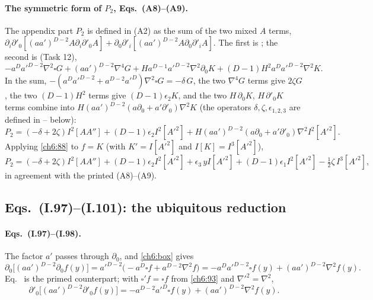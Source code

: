 \paragraph{The symmetric form of $P_2$, Eqs.~(A8)--(A9).} The appendix part $P_2$ is defined in (A2) as the sum of the two mixed $A$ terms,
$\partial_i\partial'_0[(aa')^{D-2}A\partial_i\partial'_0A]+\partial_0\partial'_i[(aa')^{D-2}A\partial_0\partial'_iA]$. The first is ; the second
is  (Task 12),
\begin{equation}
-a^Da'^{D-2}\nabla^2\square G+(aa')^{D-2}\nabla^4G+Ha^{D-1}a'^{D-2}\nabla^2\partial_0K+(D-1)H^2a^Da'^{D-2}\nabla^2K .
\end{equation}
In the sum, $-(a^Da'^{D-2}+a^{D-2}a'^D)\nabla^2\square G=-\delta\,G$, the two $\nabla^4G$ terms give $2\zeta G$, the two $(D-1)H^2$ terms give
$(D-1)\epsilon_2K$, and the two $H\,\partial_0K$, $H\,\partial'_0K$ terms combine into $H(aa')^{D-2}(a\partial_0+a'\partial'_0)\nabla^2K$
(the operators $\delta,\zeta,\epsilon_{1,2,3}$ are defined in -- below):
\begin{equation}
P_2=(-\delta+2\zeta)I^2[AA'']+(D-1)\epsilon_2I^2[A'^2]+H(aa')^{D-2}(a\partial_0+a'\partial'_0)\nabla^2I^2[A'^2] .\tag{I.A8}
\end{equation}
Applying \eqref{ch6:88} to $f=K$ (with $K'=I[A'^2]$ and $I[K]=I^3[A'^2]$),
\begin{equation}
P_2=(-\delta+2\zeta)I^2[AA'']+(D-1)\epsilon_2I^2[A'^2]+\epsilon_3\,yI[A'^2]+(D-1)\epsilon_1I^2[A'^2]-\tfrac12\zeta\,I^3[A'^2],\tag{I.A9}
\end{equation}
in agreement with the printed (A8)--(A9).

\subsection{Eqs.~(I.97)--(I.101): the ubiquitous reduction \texorpdfstring{\tD}{}}
\label{ch6:97-101}

\paragraph{Eqs.~(I.97)--(I.98).} The factor $a'$ passes through $\partial_0$, and \eqref{ch6:box} gives
\begin{equation}
\partial_0\big[(aa')^{D-2}\partial_0f(y)\big]=a'^{D-2}\big(-a^D\square f+a^{D-2}\nabla^2f\big)
=-a^Da'^{D-2}\square f(y)+(aa')^{D-2}\nabla^2f(y) .\tag{I.97}
\end{equation}
Eq.~ is the primed counterpart; with $\square'f=\square f$ from \eqref{ch6:93} and $\nabla'^2=\nabla^2$,
\begin{equation}
\partial'_0\big[(aa')^{D-2}\partial'_0f(y)\big]=-a^{D-2}a'^D\square f(y)+(aa')^{D-2}\nabla^2f(y) .\tag{I.98}
\end{equation}

